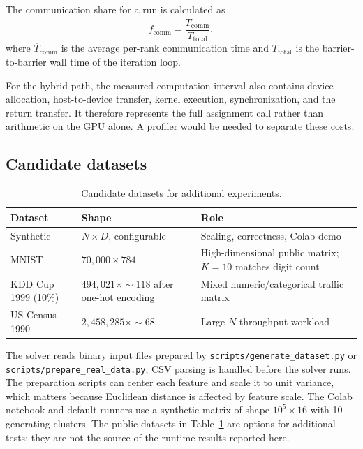 \documentclass[conference]{IEEEtran}
\DeclareRobustCommand{\file}[1]{\texttt{#1}}
\begin{document}
The communication share for a run is calculated as
\begin{equation}
  f_{\mathrm{comm}} = \frac{\overline{T}_{\mathrm{comm}}}{T_{\mathrm{total}}} ,
  \label{eq:overhead}
\end{equation}
where $\overline{T}_{\mathrm{comm}}$ is the average per-rank communication time and $T_{\mathrm{total}}$ is the barrier-to-barrier wall time of the iteration loop.

For the hybrid path, the measured computation interval also contains device allocation, host-to-device transfer, kernel execution, synchronization, and the return transfer. It therefore represents the full assignment call rather than arithmetic on the GPU alone. A profiler would be needed to separate these costs.

\subsection{Candidate datasets}
\label{sec:data}

\begin{table}[t]
\centering
\caption{Candidate datasets for additional experiments.}
\label{tab:datasets}
\renewcommand{\arraystretch}{1.18}
\begin{tabularx}{\textwidth}{@{}>{\raggedright\arraybackslash}p{1.5in}
                              >{\raggedright\arraybackslash}p{2.2in}
                              >{\raggedright\arraybackslash}X@{}}
\toprule
\textbf{Dataset} & \textbf{Shape} & \textbf{Role} \\
\midrule
Synthetic         & $N \times D$, configurable     & Scaling, correctness, Colab demo \\
MNIST \cite{lecun-mnist} & $70{,}000 \times 784$  & High-dimensional public matrix; $K=10$ matches digit count \\
KDD Cup 1999 (10\%) \cite{kddcup1999} & $494{,}021 \times {\sim}118$ after one-hot encoding & Mixed numeric/categorical traffic matrix \\
US Census 1990 \cite{census1990} & $2{,}458{,}285 \times {\sim}68$ & Large-$N$ throughput workload \\
\bottomrule
\end{tabularx}
\end{table}

The solver reads binary input files prepared by \file{scripts/generate\_dataset.py} or \file{scripts/prepare\_real\_data.py}; CSV parsing is handled before the solver runs. The preparation scripts can center each feature and scale it to unit variance, which matters because Euclidean distance is affected by feature scale. The Colab notebook and default runners use a synthetic matrix of shape $10^5 \times 16$ with 10 generating clusters. The public datasets in Table~\ref{tab:datasets} are options for additional tests; they are not the source of the runtime results reported here.
\end{document}
